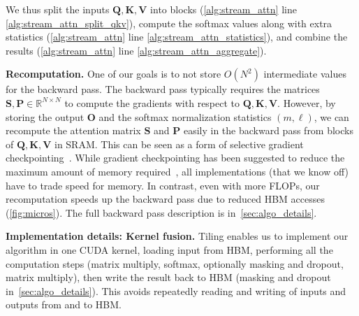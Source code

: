 We thus split the inputs $\mathbf{Q}, \mathbf{K}, \mathbf{V}$ into blocks (\ref{alg:stream_attn} line \ref{alg:stream_attn_split_qkv}), compute the softmax values along with extra statistics (\ref{alg:stream_attn} line \ref{alg:stream_attn_statistics}), and combine the results (\ref{alg:stream_attn} line \ref{alg:stream_attn_aggregate}).

\textbf{Recomputation.}
One of our goals is to not store $O(N^2)$ intermediate values for the backward pass. The backward pass typically requires the matrices
$\mathbf{S}, \mathbf{P} \in \mathbb{R}^{N \times N}$ to compute the gradients with respect to $\mathbf{Q}, \mathbf{K}, \mathbf{V}$.
However, by storing the output $\mathbf{O}$ and the softmax normalization statistics $(m, \ell)$, we can recompute the attention matrix $\mathbf{S}$ and $\mathbf{P}$ easily in the backward pass from blocks of $\mathbf{Q}, \mathbf{K}, \mathbf{V}$ in SRAM. This can be seen as a form of selective gradient checkpointing~\citep{griewank2008evaluating, chen2016training}. While gradient checkpointing has been suggested to reduce the maximum amount of memory required~\citep{rabe2021self}, all implementations (that we know off) have to trade speed for memory. In contrast, even with more FLOPs, our recomputation speeds up the backward pass due to reduced HBM accesses (\ref{fig:micros}).
The full backward pass description is in~\ref{sec:algo_details}.

\textbf{Implementation details: Kernel fusion.} Tiling enables us to implement our algorithm in one CUDA kernel, loading input from HBM, performing all the computation steps (matrix multiply, softmax, optionally masking and dropout, matrix multiply), then write the result back to HBM (masking and dropout in~\ref{sec:algo_details}).
This avoids repeatedly reading and writing of inputs and outputs from and to HBM.

